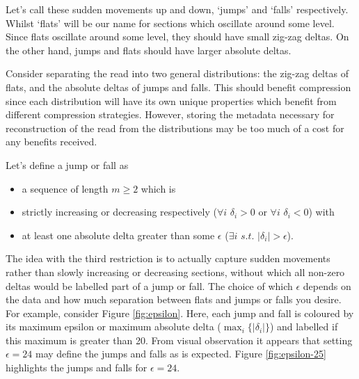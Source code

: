 

Let's call these sudden movements up and down, `jumps' and `falls'
respectively. Whilst `flats' will be our name for sections which oscillate
around some level. Since flats oscillate around some level, they should have
small zig-zag deltas. On the other hand, jumps and flats should have larger
absolute deltas.

Consider separating the read into two general distributions: the zig-zag deltas
of flats, and the absolute deltas of jumps and falls. This should benefit
compression since each distribution will have its own unique properties which
benefit from different compression strategies. However, storing the metadata
necessary for reconstruction of the read from the distributions may be too much
of a cost for any benefits received.

Let's define a jump or fall as
\begin{itemize}
	\item a sequence of length $m\ge 2$ which is
	\item strictly increasing or decreasing respectively ($\forall i$ $\delta_i>0$ or $\forall i$ $\delta_i < 0$) with
	\item at least one absolute delta greater than some $\epsilon$ ($\exists i$ $s.t.$ $|\delta_i|>\epsilon$).
\end{itemize}

The idea with the third restriction is to actually capture sudden movements
rather than slowly increasing or decreasing sections, without which all non-zero
deltas would be labelled part of a jump or fall. The choice of which $\epsilon$
depends on the data and how much separation between flats and jumps or falls you
desire. For example, consider Figure \ref{fig:epsilon}. Here, each jump and fall
is coloured by its maximum epsilon or maximum absolute delta
($\max_i\{|\delta_i|\}$) and labelled if this maximum is greater than 20. From
visual observation it appears that setting $\epsilon=24$ may define the jumps
and falls as is expected. Figure \ref{fig:epsilon-25} highlights the jumps and
falls for $\epsilon=24$.



